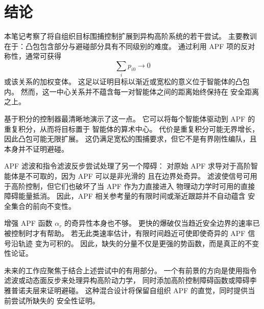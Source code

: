 \section{结论}

本笔记考察了将自组织目标围捕控制扩展到异构高阶系统的若干尝试。
主要教训在于：凸包包含部分与避碰部分具有不同级别的难度。
通过利用 APF 项的反对称性，通常可获得
\[
    \sum_i p_{i0}\to0
\]
或该关系的加权变体。
这足以证明目标以渐近或宽松的意义位于智能体的凸包内。
然而，这一中心关系并不蕴含每一对智能体之间的距离始终保持在
安全距离之上。

基于积分的控制器最清晰地演示了这一点。
它可以将每个智能体驱动到 APF 的重复积分，从而将目标置于
智能体的算术中心。
代价是重复积分可能无界增长，因此凸包可能无限扩展。
这仍满足宽松的围捕要求，但它不是有界刚性编队，且本身并不证明避碰。

APF 滤波和指令滤波反步尝试处理了另一个障碍：
对原始 APF 求导对于高阶智能体是不可取的，因为 APF 可以是非光滑的
且在边界处奇异。
滤波使信号可用于高阶控制，但它们也破坏了当 APF 作为力直接进入
物理动力学时可用的直接障碍能量抵消。
因此，APF 相关参考量的有限时间或渐近跟踪并不自动蕴含
安全集合的前向不变性。

增强 APF 函数 $\alpha_r$ 的奇异性本身也不够。
更快的爆破仅当趋近安全边界的速率已被控制时才有帮助。
若无此类速率估计，有限时间趋近可使即使奇异的 APF 信号沿轨迹
变为可积的。
因此，缺失的分量不仅是更强的势函数，而是真正的不变性论证。

未来的工作应聚焦于结合上述尝试中的有用部分。
一个有前景的方向是使用指令滤波或动态面反步来处理异构高阶动力学，
同时添加高阶控制障碍函数或障碍李雅普诺夫层来证明避碰。
这种混合设计将保留自组织 APF 的直觉，同时提供当前尝试所缺失的
安全性证明。